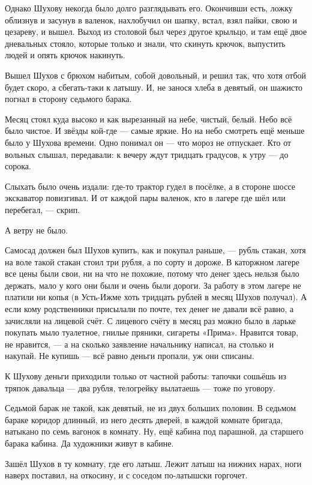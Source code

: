 Однако Шухову некогда было долго разглядывать его. Окончивши есть, ложку облизнув и засунув 
в валенок, нахлобучил он шапку, встал, взял пайки, свою и цезареву, и вышел. Выход из столовой 
был через другое крыльцо, и там ещё двое дневальных стояло, которые только и знали, что 
скинуть крючок, выпустить людей и опять крючок накинуть.

Вышел Шухов с брюхом набитым, собой довольный, и решил так, что хотя отбой будет скоро, а 
сбегать-таки к латышу. И, не занося хлеба в девятый, он шажисто погнал в сторону седьмого 
барака.

Месяц стоял куда высоко и как вырезанный на небе, чистый, белый. Небо всё было чистое. И 
звёзды кой-где --- самые яркие. Но на небо смотреть ещё меньше было у Шухова времени. Одно 
понимал он --- что мороз не отпускает. Кто от вольных слышал, передавали: к вечеру ждут 
тридцать градусов, к утру --- до сорока.

Слыхать было очень издали: где-то трактор гудел в посёлке, а в стороне шоссе экскаватор 
повизгивал. И от каждой пары валенок, кто в лагере где шёл или перебегал, --- скрип.

А ветру не было.

Самосад должен был Шухов купить, как и покупал раньше, --- рубль стакан, хотя на воле такой 
стакан стоил три рубля, а по сорту и дороже. В каторжном лагере все цены были свои, ни на что 
не похожие, потому что денег здесь нельзя было держать, мало у кого они были и очень были 
дороги. За работу в этом лагере не платили ни копья (в Усть-Ижме хоть тридцать рублей в месяц 
Шухов получал). А если кому родственники присылали по почте, тех денег не давали всё равно, а 
зачисляли на лицевой счёт. С лицевого счёту в месяц раз можно было в ларьке покупать мыло 
туалетное, гнилые пряники, сигареты «Прима». Нравится товар, не нравится, --- а на сколько 
заявление начальнику написал, на столько и накупай. Не купишь --- всё равно деньги пропали, уж 
они списаны.

К Шухову деньги приходили только от частной работы: тапочки сошьёшь из тряпок давальца --- 
два рубля, телогрейку вылатаешь --- тоже по уговору.

Седьмой барак не такой, как девятый, не из двух больших половин. В седьмом бараке коридор 
длинный, из него десять дверей, в каждой комнате бригада, натыкано по семь вагонок в комнату. 
Ну, ещё кабина под парашной, да старшего барака кабина. Да художники живут в кабине.

Зашёл Шухов в ту комнату, где его латыш. Лежит латыш на нижних нарах, ноги наверх поставил, на 
откосину, и с соседом по-латышски горгочет.

